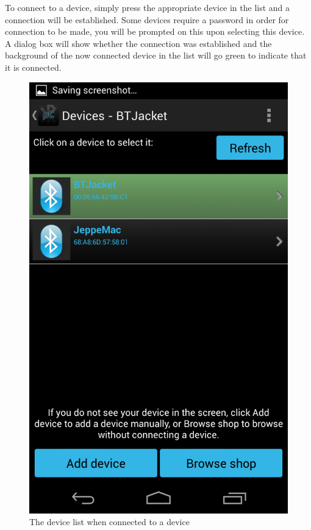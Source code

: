  To connect to a device, simply press the appropriate device in the list and a connection will be established. Some devices require a password in order for connection to be made, you will be prompted on this upon selecting this device. A dialog box will show whether the connection was established and the background of the now connected device in the list will go green to indicate that it is connected. \\
\newline
\newline
\begin{figure}[H]
	\centering
	\includegraphics[scale = 0.3]{images/Screenshots/connected.png}
	\caption{The device list when connected to a device}
\end{figure}

